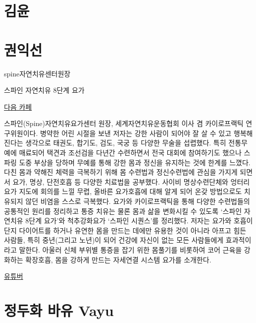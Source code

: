 \documentclass[12pt, a4paper, oneside]{book}
\let\stdsection\section
\renewcommand\section{\newpage\stdsection}
\begin{document}
	\section{김윤}



%
	\section{권익선}


		spine자연치유센터원장

		스파인 자연치유 8단계 요가

		\href{http://cafe.daum.net/NHyoga}{다음 카페}



			스파인(Spine)자연치유요가센터 원장, 세계자연치유운동협회 이사 겸 카이로프랙틱 연구위원이다. 
			병약한 어린 시절을 보낸 저자는 강한 사람이 되어야 잘 살 수 있고 행복해진다는 생각으로 태권도, 합기도, 검도, 국궁 등 다양한 무술을 섭렵했다. 
			특히 전통무예에 매료되어 택견과 조선검을 다년간 수련하면서 전국 대회에 참여하기도 했으나 스파링 도중 부상을 당하며 무예를 통해 강한 몸과 정신을 유지하는 것에 한계를 느꼈다. 
			다친 몸과 약해진 체력을 극복하기 위해 몸 수련법과 정신수련법에 관심을 가지게 되면서 요가, 명상, 단전호흡 등 다양한 치료법을 공부했다. 
			사이비 명상수련단체와 엉터리 요가 지도에 회의를 느낄 무렵, 올바른 요가호흡에 대해 알게 되어 온갖 방법으로도 치유되지 않던 비염을 스스로 극복했다. 
			요가와 카이로프랙틱을 통해 다양한 수련법들의 공통적인 원리를 정리하고 통증 치유는 물론 몸과 삶을 변화시킬 수 있도록 ‘스파인 자연치유 8단계 요가’와 척추강화요가 ‘스파인 시퀀스’를 정리했다. 
			저자는 요가와 호흡이 단지 다이어트를 하거나 유연한 몸을 만드는 데에만 유용한 것이 아니라 아프고 힘든 사람들, 특히 중년(그리고 노년)이 되어 건강에 자신이 없는 모든 사람들에게 효과적이라고 말한다. 
			아울러 신체 부위별 통증을 잡기 위한 몸풀기를 비롯하여 코어 근육을 강화하는 확장호흡, 몸을 강하게 만드는 자세연결 시스템 요가를 소개한다.


		\href{https://www.youtube.com/channel/UCmvG5Zebt11jTuEj55ItkSg/featured}{유튜버}



%
	\section{정두화 바유 Vayu}
\end{document}
